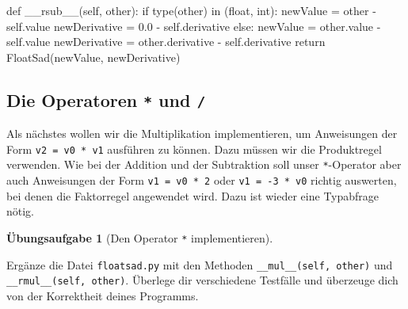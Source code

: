 \documentclass[
  a4paper,
  DIV=11]{scrreprt}
\newenvironment{Shaded}{\begin{snugshade}}{\end{snugshade}}
\newcommand{\BuiltInTok}[1]{\textcolor[rgb]{0.00,0.23,0.31}{#1}}
\newcommand{\ControlFlowTok}[1]{\textcolor[rgb]{0.00,0.23,0.31}{#1}}
\newcommand{\FloatTok}[1]{\textcolor[rgb]{0.68,0.00,0.00}{#1}}
\newcommand{\FunctionTok}[1]{\textcolor[rgb]{0.28,0.35,0.67}{#1}}
\newcommand{\KeywordTok}[1]{\textcolor[rgb]{0.00,0.23,0.31}{#1}}
\newcommand{\NormalTok}[1]{\textcolor[rgb]{0.00,0.23,0.31}{#1}}
\newcommand{\OperatorTok}[1]{\textcolor[rgb]{0.37,0.37,0.37}{#1}}
\newcommand{\VariableTok}[1]{\textcolor[rgb]{0.07,0.07,0.07}{#1}}
\theoremstyle{definition}
\newtheorem{exercise}{Übungsaufgabe}[chapter]
\theoremstyle{definition}
\theoremstyle{remark}
\begin{document}
\begin{tcolorbox}
\begin{Shaded}
\begin{Highlighting}[]
\KeywordTok{def} \FunctionTok{\_\_rsub\_\_}\NormalTok{(}\VariableTok{self}\NormalTok{, other):}
    \ControlFlowTok{if} \BuiltInTok{type}\NormalTok{(other) }\KeywordTok{in}\NormalTok{ (}\BuiltInTok{float}\NormalTok{, }\BuiltInTok{int}\NormalTok{):}
\NormalTok{        newValue }\OperatorTok{=}\NormalTok{ other }\OperatorTok{{-}} \VariableTok{self}\NormalTok{.value}
\NormalTok{        newDerivative }\OperatorTok{=} \FloatTok{0.0} \OperatorTok{{-}} \VariableTok{self}\NormalTok{.derivative}
    \ControlFlowTok{else}\NormalTok{:}
\NormalTok{        newValue }\OperatorTok{=}\NormalTok{ other.value }\OperatorTok{{-}} \VariableTok{self}\NormalTok{.value}
\NormalTok{        newDerivative }\OperatorTok{=}\NormalTok{ other.derivative }\OperatorTok{{-}} \VariableTok{self}\NormalTok{.derivative}
    \ControlFlowTok{return}\NormalTok{ FloatSad(newValue, newDerivative)}
\end{Highlighting}
\end{Shaded}

\end{tcolorbox}

\hypertarget{die-operatoren-und}{%
\subsection{\texorpdfstring{Die Operatoren \texttt{*} und
\texttt{/}}{Die Operatoren * und /}}\label{die-operatoren-und}}

Als nächstes wollen wir die Multiplikation implementieren, um
Anweisungen der Form \texttt{v2\ =\ v0\ *\ v1} ausführen zu können. Dazu
müssen wir die Produktregel verwenden. Wie bei der Addition und der
Subtraktion soll unser \texttt{*}-Operator aber auch Anweisungen der
Form \texttt{v1\ =\ v0\ *\ 2} oder \texttt{v1\ =\ -3\ *\ v0} richtig
auswerten, bei denen die Faktorregel angewendet wird. Dazu ist wieder
eine Typabfrage nötig.

\begin{exercise}[Den Operator \texttt{*}
implementieren]\protect\hypertarget{exr-ImplementMul}{}\label{exr-ImplementMul}

Ergänze die Datei \texttt{floatsad.py} mit den Methoden
\texttt{\_\_mul\_\_(self,\ other)} und
\texttt{\_\_rmul\_\_(self,\ other)}. Überlege dir verschiedene Testfälle
und überzeuge dich von der Korrektheit deines Programms.

\end{exercise}
\end{document}
